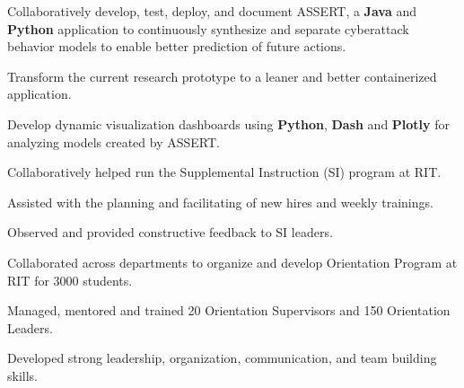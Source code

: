 \documentclass[]{deedy-resume-openfont}
\begin{document}
\begin{minipage}[t]{0.67\textwidth}
\begin{tightemize}
  \item Collaboratively develop, test, deploy, and document ASSERT, a \textbf{Java} and \textbf{Python} application to continuously synthesize and separate cyberattack behavior models to enable better prediction of future actions.
  \item Transform the current research prototype to a leaner and better containerized application.
  \item Develop dynamic visualization dashboards using \textbf{Python}, \textbf{Dash} and \textbf{Plotly} for analyzing models created by ASSERT.
\end{tightemize}
\begin{tightemize}
  \item Collaboratively helped run the Supplemental Instruction (SI) program at RIT.
  \item Assisted with the planning and facilitating of new hires and weekly trainings.
  \item Observed and provided constructive feedback to SI leaders.
\end{tightemize}
\begin{tightemize}
  \item Collaborated across departments to organize and develop Orientation Program at RIT for 3000 students.
  \item Managed, mentored and trained 20 Orientation Supervisors and 150 Orientation Leaders.
  \item Developed strong leadership, organization, communication, and team building skills.
\end{tightemize}



\end{minipage}
\end{document}
